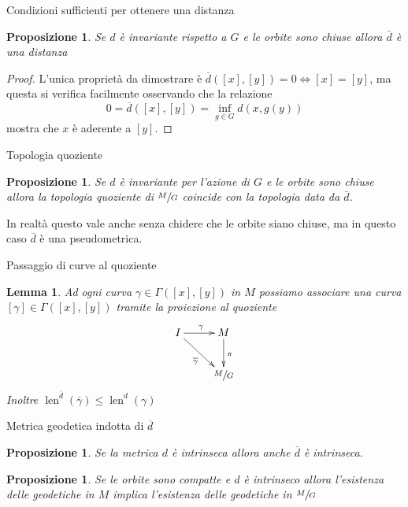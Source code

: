 \documentclass{beamer}
\newcounter{counter1}
\theoremstyle{plain}
\newtheorem{mylem}[counter1]{Lemma}
\newtheorem{mypro}[counter1]{Proposizione}
\theoremstyle{definition}
\theoremstyle{remark}
\newcommand{\obar}[1]{\overline{#1}}
\newcommand{\pa}[1]{\left(#1\right)}
\newcommand{\bra}[1]{\left[#1\right]}
\DeclareMathOperator{\len}{len}
\begin{document}
\begin{frame}{Condizioni sufficienti per ottenere una distanza}
  \begin{mypro}
    Se $d$ è invariante rispetto a $G$ e le orbite sono chiuse allora
    $\bar d$ è una distanza
  \end{mypro}
  \begin{proof}
    L'unica proprietà da dimostrare è $\obar d(\bra{x},
    \bra{y}) = 0 \Leftrightarrow \bra{x} = \bra{y}$, ma questa si
    verifica facilmente osservando che la relazione
    \[ 0 = \obar d(\bra{x},\bra{y}) = \inf _{g \in G} d(x,g(y)) \] 
    mostra che $x$ è aderente a $\bra{y}$.
  \end{proof}
\end{frame}

\begin{frame}{Topologia quoziente}
  \begin{mypro}
    Se $d$ è invariante per l'azione di $G$ e le orbite sono chiuse
    allora la topologia quoziente di $\sfrac{M}{G}$ coincide con la
    topologia data da $\bar d$.
  \end{mypro}

  In realtà questo vale anche senza chidere che le orbite siano
  chiuse, ma in questo caso $\obar d$ è una pseudometrica.
\end{frame}

\begin{frame}{Passaggio di curve al quoziente}
  \begin{mylem}
    Ad ogni curva $\gamma \in \Gamma ( \bra{x}, \bra{y} )$ in $M$
    possiamo associare una curva $\bra{\gamma} \in \Gamma( \bra{x},
    \bra{y})$ tramite la proiezione al quoziente
    \[ 
    \xymatrix{I \ar[r]^\gamma \ar[dr] _{\obar \gamma}& M \ar[d]^\pi \\
      & \sfrac{M}{G}  
    }
    \]
    Inoltre $\len ^{\obar d} \pa{ \obar \gamma} \le \len ^d \pa{\gamma}$
  \end{mylem}
\end{frame}

\begin{frame}{Metrica geodetica indotta di $\obar d$}
  \begin{mypro}
    Se la metrica $d$ è intrinseca allora anche $\bar d$ è intrinseca.
  \end{mypro}
  \begin{mypro}
    Se le orbite sono compatte e $d$ è intrinseco allora l'esistenza
    delle geodetiche in $M$ implica l'esistenza delle geodetiche in
    $\sfrac{M}{G}$
  \end{mypro}
\end{frame}
\end{document}
